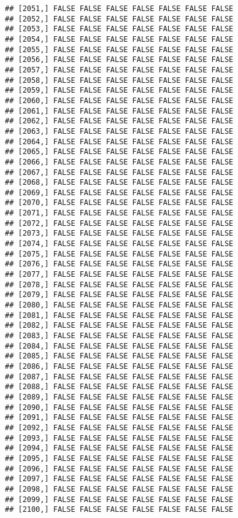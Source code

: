 \documentclass[
]{article}
\begin{document}
\begin{verbatim}
## [2051,] FALSE FALSE FALSE FALSE FALSE FALSE FALSE
## [2052,] FALSE FALSE FALSE FALSE FALSE FALSE FALSE
## [2053,] FALSE FALSE FALSE FALSE FALSE FALSE FALSE
## [2054,] FALSE FALSE FALSE FALSE FALSE FALSE FALSE
## [2055,] FALSE FALSE FALSE FALSE FALSE FALSE FALSE
## [2056,] FALSE FALSE FALSE FALSE FALSE FALSE FALSE
## [2057,] FALSE FALSE FALSE FALSE FALSE FALSE FALSE
## [2058,] FALSE FALSE FALSE FALSE FALSE FALSE FALSE
## [2059,] FALSE FALSE FALSE FALSE FALSE FALSE FALSE
## [2060,] FALSE FALSE FALSE FALSE FALSE FALSE FALSE
## [2061,] FALSE FALSE FALSE FALSE FALSE FALSE FALSE
## [2062,] FALSE FALSE FALSE FALSE FALSE FALSE FALSE
## [2063,] FALSE FALSE FALSE FALSE FALSE FALSE FALSE
## [2064,] FALSE FALSE FALSE FALSE FALSE FALSE FALSE
## [2065,] FALSE FALSE FALSE FALSE FALSE FALSE FALSE
## [2066,] FALSE FALSE FALSE FALSE FALSE FALSE FALSE
## [2067,] FALSE FALSE FALSE FALSE FALSE FALSE FALSE
## [2068,] FALSE FALSE FALSE FALSE FALSE FALSE FALSE
## [2069,] FALSE FALSE FALSE FALSE FALSE FALSE FALSE
## [2070,] FALSE FALSE FALSE FALSE FALSE FALSE FALSE
## [2071,] FALSE FALSE FALSE FALSE FALSE FALSE FALSE
## [2072,] FALSE FALSE FALSE FALSE FALSE FALSE FALSE
## [2073,] FALSE FALSE FALSE FALSE FALSE FALSE FALSE
## [2074,] FALSE FALSE FALSE FALSE FALSE FALSE FALSE
## [2075,] FALSE FALSE FALSE FALSE FALSE FALSE FALSE
## [2076,] FALSE FALSE FALSE FALSE FALSE FALSE FALSE
## [2077,] FALSE FALSE FALSE FALSE FALSE FALSE FALSE
## [2078,] FALSE FALSE FALSE FALSE FALSE FALSE FALSE
## [2079,] FALSE FALSE FALSE FALSE FALSE FALSE FALSE
## [2080,] FALSE FALSE FALSE FALSE FALSE FALSE FALSE
## [2081,] FALSE FALSE FALSE FALSE FALSE FALSE FALSE
## [2082,] FALSE FALSE FALSE FALSE FALSE FALSE FALSE
## [2083,] FALSE FALSE FALSE FALSE FALSE FALSE FALSE
## [2084,] FALSE FALSE FALSE FALSE FALSE FALSE FALSE
## [2085,] FALSE FALSE FALSE FALSE FALSE FALSE FALSE
## [2086,] FALSE FALSE FALSE FALSE FALSE FALSE FALSE
## [2087,] FALSE FALSE FALSE FALSE FALSE FALSE FALSE
## [2088,] FALSE FALSE FALSE FALSE FALSE FALSE FALSE
## [2089,] FALSE FALSE FALSE FALSE FALSE FALSE FALSE
## [2090,] FALSE FALSE FALSE FALSE FALSE FALSE FALSE
## [2091,] FALSE FALSE FALSE FALSE FALSE FALSE FALSE
## [2092,] FALSE FALSE FALSE FALSE FALSE FALSE FALSE
## [2093,] FALSE FALSE FALSE FALSE FALSE FALSE FALSE
## [2094,] FALSE FALSE FALSE FALSE FALSE FALSE FALSE
## [2095,] FALSE FALSE FALSE FALSE FALSE FALSE FALSE
## [2096,] FALSE FALSE FALSE FALSE FALSE FALSE FALSE
## [2097,] FALSE FALSE FALSE FALSE FALSE FALSE FALSE
## [2098,] FALSE FALSE FALSE FALSE FALSE FALSE FALSE
## [2099,] FALSE FALSE FALSE FALSE FALSE FALSE FALSE
## [2100,] FALSE FALSE FALSE FALSE FALSE FALSE FALSE

\end{verbatim}
\end{document}

